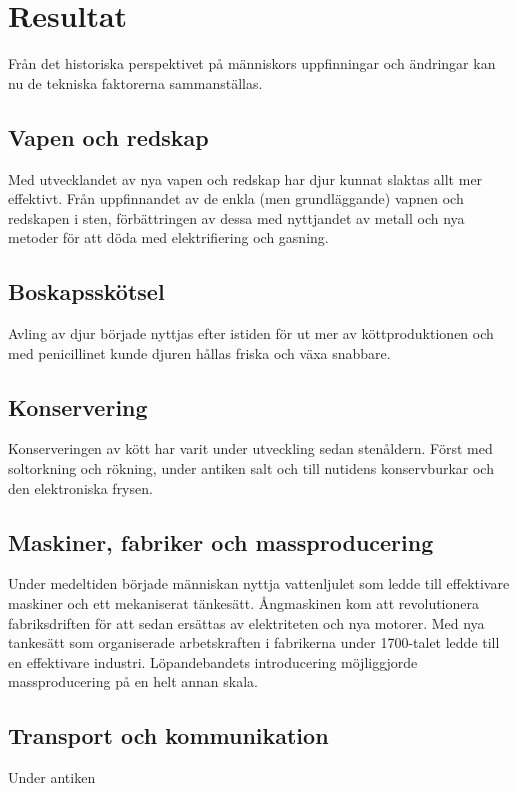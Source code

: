 \section{Resultat}
Från det historiska perspektivet på människors uppfinningar och ändringar kan nu de tekniska faktorerna sammanställas. 

\subsection{Vapen och redskap}
Med utvecklandet av nya vapen och redskap har djur kunnat slaktas allt mer effektivt. Från uppfinnandet av de enkla (men grundläggande) vapnen och redskapen i sten, förbättringen av dessa med nyttjandet av metall och nya metoder för att döda med elektrifiering och gasning.

\subsection{Boskapsskötsel}
Avling av djur började nyttjas efter istiden för ut mer av köttproduktionen och med penicillinet kunde djuren hållas friska och växa snabbare.  

\subsection{Konservering}
Konserveringen av kött har varit under utveckling sedan stenåldern. Först med soltorkning och rökning, under antiken salt och till nutidens konservburkar och den elektroniska frysen.   

\subsection{Maskiner, fabriker och massproducering}
Under medeltiden började människan nyttja vattenljulet som ledde till effektivare maskiner och ett mekaniserat tänkesätt. Ångmaskinen kom att revolutionera fabriksdriften för att sedan ersättas av elektriteten och nya motorer. 
\newline
\newline
Med nya tankesätt som organiserade arbetskraften i fabrikerna under 1700-talet ledde till en effektivare industri. Löpandebandets introducering möjliggjorde massproducering på en helt annan skala. 

\subsection{Transport och kommunikation}
Under antiken   
